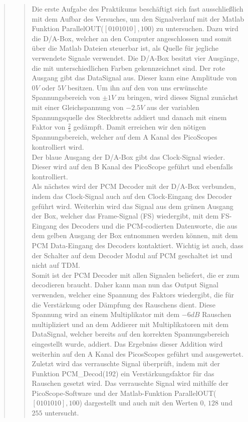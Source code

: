 \begin{quote}
\begin{quote}
        Die erste Aufgabe des Praktikums beschäftigt sich fast ausschließlich
        mit dem Aufbar des Versuches, um den Signalverlauf mit der Matlab
        Funktion ParallelOUT($[0 1 0 1 0 1 0],100$) zu untersuchen. Dazu wird
        die D/A-Box, welcher an den Computer angeschlossen und somit über
        die Matlab Dateien steuerbar ist, als Quelle für jegliche verwendete
        Signale verwendet. Die D/A-Box besitzt vier Ausgänge, die mit
        unterschiedlichen Farben gekennzeichnet sind. Der rote Ausgang gibt das
        DataSignal aus. Dieser kann eine Amplitude von $0V$ oder $5V$ besitzen.
        Um ihn auf den von uns erwünschte Spannungsbereich von $\pm 1V$ zu
        bringen, wird dieses Signal zunächst mit einer Gleichspannung von
        $-2.5V$ aus der variablen Spannungsquelle des Steckbretts addiert und
        danach mit einem Faktor von $\frac{2}{5}$ gedämpft. Damit erreichen wir
        den nötigen Spannungsbereich, welcher auf dem A Kanal des PicoScopes
        kontrolliert wird.\\
        Der blaue Ausgang der D/A-Box gibt das Clock-Signal wieder. Dieser wird
        auf den B Kanal des PicoScope geführt und ebenfalls kontrolliert.\\
        Als nächstes wird der PCM Decoder mit der D/A-Box verbunden, indem das
        Clock-Signal auch auf den Clock-Eingang des Decoder geführt wird.
        Weiterhin wird das Signal aus dem grünen Ausgang der Box, welcher das
        Frame-Signal (FS) wiedergibt, mit dem FS-Eingang des Decoders
        und die PCM-codierten Datenworte, die aus dem gelben Ausgang der Box
        entnommen werden können, mit dem PCM Data-Eingang des Decoders
        kontaktiert. Wichtig ist auch, dass der Schalter auf dem Decoder Modul
        auf PCM geschaltet ist und nicht auf TDM.\\
        Somit ist der PCM Decoder mit allen Signalen beliefert, die er zum
        decodieren braucht. Daher kann man nun das Output Signal verwenden,
        welcher eine Spannung des Faktors wiedergibt, die für die
        Verstärkung oder Dämpfung des Rauschens dient. Diese Spannung wird an
        einem Multiplikator mit dem $-6 dB$ Rauschen multipliziert und an dem
        Addierer mit Multiplikatoren mit dem DataSignal, welcher bereits auf den korrekten Spannungsbereich
        eingestellt wurde, addiert. Das Ergebniss dieser Addition wird weiterhin
        auf den A Kanal des PicosScopes geführt und ausgewertet.\\
        
        Zuletzt wird das verrauschte Signal überprüft, indem mit der Funktion
        PCM\_Decod(192) ein Verstärkungsfaktor für das Rauschen gesetzt wird.
        Das verrauschte Signal wird mithilfe der PicoScope-Software und der
        Matlab-Funktion ParallelOUT($[0 1 0 1 0 1 0],100$) dargestellt und auch
        mit den Werten $0$, $128$ und $255$ untersucht.
        

\end{quote}
\end{quote}

